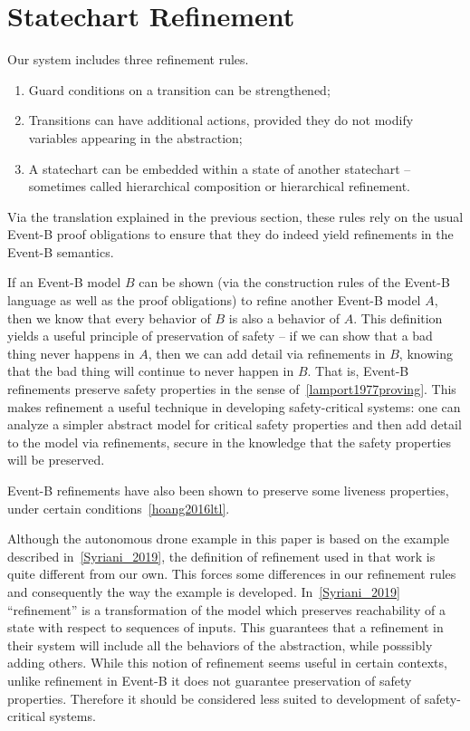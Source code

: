 
\section{Statechart Refinement}
\label{sec:scref}

Our system includes three refinement rules.

\begin{enumerate}
\item Guard conditions on a transition can be strengthened;
\item Transitions can have additional actions, provided they do not
  modify variables appearing in the abstraction;
\item A statechart can be embedded within a state of another
  statechart -- sometimes called hierarchical composition or
  hierarchical refinement.
\end{enumerate}

Via the translation explained in the previous section, these rules
rely on the usual Event-B proof obligations to ensure that they do
indeed yield refinements in the Event-B semantics.

If an Event-B model $B$ can be shown (via the construction rules of
the Event-B language as well as the proof obligations) to refine
another Event-B model $A$, then we know that every behavior of $B$ is
also a behavior of $A$. This definition yields a useful principle of
preservation of safety -- if we can show that a bad thing never
happens in $A$, then we can add detail via refinements in $B$, knowing
that the bad thing will continue to never happen in $B$. That is,
Event-B refinements preserve safety properties in the sense
of~\ref{lamport1977proving}. This makes refinement a useful technique
in developing safety-critical systems: one can analyze a simpler
abstract model for critical safety properties and then add detail to
the model via refinements, secure in the knowledge that the safety
properties will be preserved.

Event-B refinements have also been shown to preserve some liveness
properties, under certain conditions~\ref{hoang2016ltl}.

Although the autonomous drone example in this paper is based on the
example described in~\ref{Syriani_2019}, the definition of refinement
used in that work is quite different from our own. This forces some
differences in our refinement rules and consequently the way the
example is developed. In~\ref{Syriani_2019} ``refinement'' is a
transformation of the model which preserves reachability of a state
with respect to sequences of inputs. This guarantees that a refinement
in their system will include all the behaviors of the abstraction,
while posssibly adding others. While this notion of refinement seems
useful in certain contexts, unlike refinement in Event-B it does not
guarantee preservation of safety properties. Therefore it should be
considered less suited to development of safety-critical systems.
